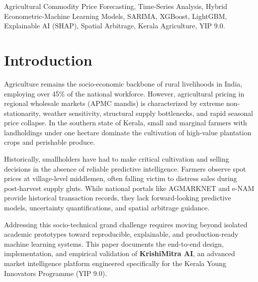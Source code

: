 \documentclass[journal,10pt,twocolumn]{IEEEtran}
\begin{document}
\begin{IEEEkeywords}
Agricultural Commodity Price Forecasting, Time-Series Analysis, Hybrid Econometric-Machine Learning Models, SARIMA, XGBoost, LightGBM, Explainable AI (SHAP), Spatial Arbitrage, Kerala Agriculture, YIP 9.0.
\end{IEEEkeywords}

\section{Introduction}
Agriculture remains the socio-economic backbone of rural livelihoods in India, employing over 45\% of the national workforce. However, agricultural pricing in regional wholesale markets (APMC mandis) is characterized by extreme non-stationarity, weather sensitivity, structural supply bottlenecks, and rapid seasonal price collapse. In the southern state of Kerala, small and marginal farmers with landholdings under one hectare dominate the cultivation of high-value plantation crops and perishable produce.

Historically, smallholders have had to make critical cultivation and selling decisions in the absence of reliable predictive intelligence. Farmers observe spot prices at village-level middlemen, often falling victim to distress sales during post-harvest supply gluts. While national portals like AGMARKNET and e-NAM provide historical transaction records, they lack forward-looking predictive models, uncertainty quantifications, and spatial arbitrage guidance.

Addressing this socio-technical grand challenge requires moving beyond isolated academic prototypes toward reproducible, explainable, and production-ready machine learning systems. This paper documents the end-to-end design, implementation, and empirical validation of \textbf{KrishiMitra AI}, an advanced market intelligence platform engineered specifically for the Kerala Young Innovators Programme (YIP 9.0).
\end{document}
